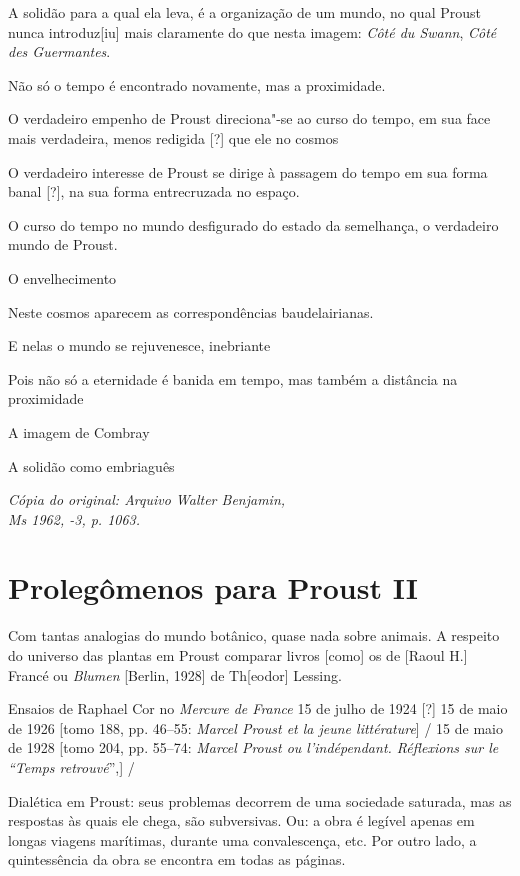 A solidão para a qual ela leva, é a organização de um mundo, no qual
Proust nunca introduz{[}iu{]} mais claramente do que nesta imagem:
\emph{Côté du Swann}, \emph{Côté des Guermantes}.

Não só o tempo é encontrado novamente, mas a proximidade.

O verdadeiro empenho de Proust direciona"-se ao curso do tempo, em sua
face mais verdadeira, menos redigida {[}?{]} que ele no cosmos

O verdadeiro interesse de Proust se dirige à passagem do tempo em sua
forma banal {[}?{]}, na sua forma entrecruzada no espaço.

O curso do tempo no mundo desfigurado do estado da semelhança, o
verdadeiro mundo de Proust.

O envelhecimento

Neste cosmos aparecem as correspondências baudelairianas.

E nelas o mundo se rejuvenesce, inebriante

Pois não só a eternidade é banida em tempo, mas também a distância na
proximidade

A imagem de Combray

A solidão como embriaguês


\begin{flushright}
\emph{\footnotesize{Cópia do original: Arquivo Walter Benjamin,\\ Ms 1962, -3, p. 1063.}}
\end{flushright}

\section{Prolegômenos para Proust II}

Com tantas analogias do mundo botânico, quase nada sobre animais. A
respeito do universo das plantas em Proust comparar livros {[}como{]} os
de {[}Raoul H.{]} Francé ou \emph{Blumen} {[}Berlin, 1928{]} de Th{[}eodor{]} Lessing.

Ensaios de Raphael Cor no \emph{Mercure de France} 15 de julho de 1924
{[}?{]} 15 de maio de 1926 {[}tomo 188, pp. 46--55: \emph{Marcel Proust et
la jeune littérature}{]} / 15 de maio de 1928 {[}tomo 204, pp. 55--74:
\emph{Marcel Proust ou l'indépendant. Réflexions sur le ``Temps
retrouvé}'',{]} /

Dialética em Proust: seus problemas decorrem de uma sociedade saturada,
mas as respostas às quais ele chega, são subversivas. Ou: a obra é
legível apenas em longas viagens marítimas, durante uma convalescença,
etc. Por outro lado, a quintessência da obra se encontra em todas as
páginas.

